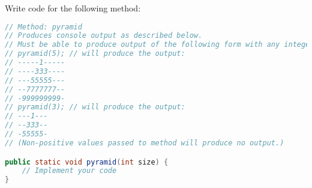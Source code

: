 \documentclass[9pt]{article}
\begin{document}
Write code for the following method:
\begin{lstlisting}[language=Java]
// Method: pyramid
// Produces console output as described below.
// Must be able to produce output of the following form with any integer as a parameter
// pyramid(5); // will produce the output:
// -----1-----
// ----333----
// ---55555---
// --7777777--
// -999999999-
// pyramid(3); // will produce the output:
// ---1---
// --333--
// -55555-
// (Non-positive values passed to method will produce no output.)

public static void pyramid(int size) {
	// Implement your code
}
\end{lstlisting}
\end{document}
